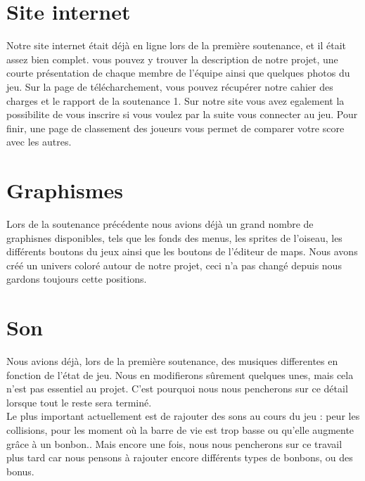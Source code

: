 \documentclass [11pt]{report}
\begin{document}
		\vspace{10mm}
		
		
	\section{Site internet}
		Notre site internet était déj\`a en ligne lors de la premi\`ere soutenance, et il était assez bien complet. vous pouvez y trouver la description de notre projet, une courte  présentation de chaque membre de l'équipe ainsi que quelques photos du jeu. Sur la page de télécharchement, vous pouvez récupérer notre cahier des charges et le rapport de la soutenance 1. Sur notre site vous avez egalement la possibilite de vous inscrire si vous voulez par la suite vous connecter au jeu. Pour finir, une page de classement des joueurs vous permet de comparer votre score avec les autres. 
		\vspace{10mm}
		
	\section{Graphismes}	
		Lors de la soutenance précédente nous avions déj\`a un grand nombre de graphisnes disponibles, tels que les fonds des menus, les sprites de l'oiseau, les différents boutons du jeux ainsi que les boutons de l'éditeur de maps. Nous avons créé un univers coloré autour de notre projet, ceci n'a pas changé depuis nous gardons toujours cette positions.
		
		\vspace{10mm}
		
	\section{Son}
		Nous avions déjà, lors de la première soutenance, des musiques differentes en fonction de l'état de jeu. Nous en modifierons sûrement quelques unes, mais cela n'est pas essentiel au projet. C'est pourquoi nous nous pencherons sur ce détail lorsque tout le reste sera termin\'e.\\
		\indent Le plus important actuellement est de rajouter des sons au cours du jeu : peur les collisions, pour les moment où la barre de vie est trop basse ou qu'elle augmente grâce à un bonbon.. Mais encore une fois, nous nous pencherons sur ce travail plus tard car nous pensons \`a rajouter encore différents types de bonbons, ou des bonus.
		
		\vspace{10mm}
\end{document}
